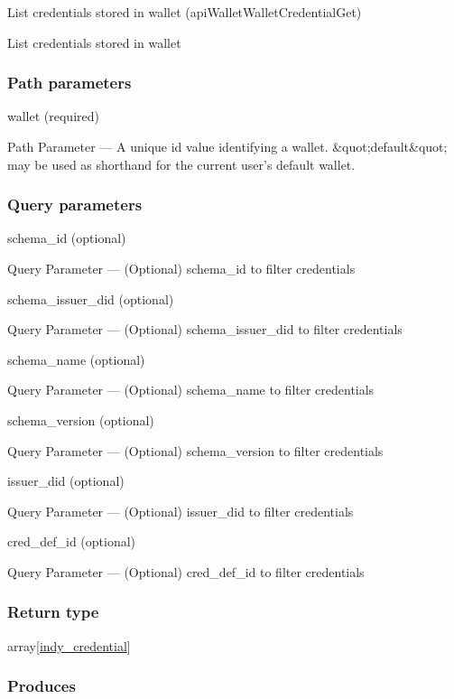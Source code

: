 List credentials stored in wallet ({apiWalletWalletCredentialGet})

List credentials stored in wallet

\hypertarget{path-parameters-107}{%
\subsubsection{Path parameters}\label{path-parameters-107}}

wallet (required)

{Path Parameter} --- A unique id value identifying a wallet.
\&quot;default\&quot; may be used as shorthand for the current user's
default wallet.

\hypertarget{query-parameters-7}{%
\subsubsection{Query parameters}\label{query-parameters-7}}

schema\_id (optional)

{Query Parameter} --- (Optional) schema\_id to filter credentials

schema\_issuer\_did (optional)

{Query Parameter} --- (Optional) schema\_issuer\_did to filter
credentials

schema\_name (optional)

{Query Parameter} --- (Optional) schema\_name to filter credentials

schema\_version (optional)

{Query Parameter} --- (Optional) schema\_version to filter credentials

issuer\_did (optional)

{Query Parameter} --- (Optional) issuer\_did to filter credentials

cred\_def\_id (optional)

{Query Parameter} --- (Optional) cred\_def\_id to filter credentials

\hypertarget{return-type-149}{%
\subsubsection{Return type}\label{return-type-149}}

array{[}\protect\hyperlink{indy_credential}{indy\_credential}{]}

\hypertarget{produces-188}{%
\subsubsection{Produces}\label{produces-188}}

